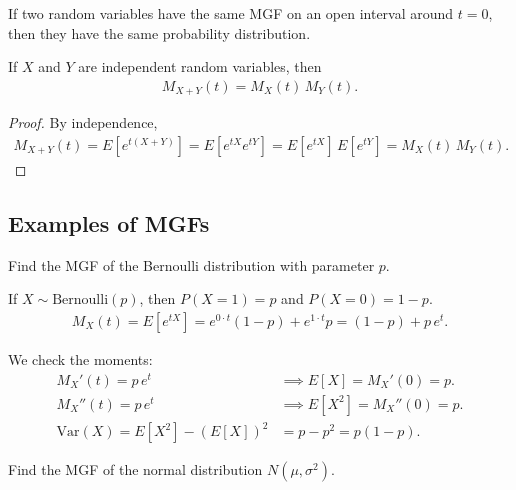 \begin{teorema}[Uniqueness]
If two random variables have the same MGF on an open interval around $t=0$, then they have the same probability distribution.
\end{teorema}

\begin{teorema}
If $X$ and $Y$ are independent random variables, then
\begin{align}
 \label{eq:2.8.13}
 M_{X+Y}(t) = M_X(t)\,M_Y(t).
\end{align}
\end{teorema}

\begin{proof}
By independence,
\begin{align}
 M_{X+Y}(t) = E[e^{t(X+Y)}] = E[e^{tX}e^{tY}] = E[e^{tX}]\,E[e^{tY}] = M_X(t)\,M_Y(t).
\end{align}
\end{proof}

\subsection{Examples of MGFs}

\begin{ejemplo}
 \label{exmp:2.8.4}
Find the MGF of the Bernoulli distribution with parameter $p$.
\end{ejemplo}

\begin{solucion}
If $X \sim \text{Bernoulli}(p)$, then $P(X=1) = p$ and $P(X=0) = 1-p$.
\begin{align}
 M_X(t) = E[e^{tX}] = e^{0 \cdot t}(1-p) + e^{1 \cdot t}p
 = (1-p) + p\,e^t.
\end{align}

We check the moments:
\begin{align}
 M_X'(t) = p\,e^t &\implies E[X] = M_X'(0) = p. \\
 M_X''(t) = p\,e^t &\implies E[X^2] = M_X''(0) = p. \\
 \text{Var}(X) = E[X^2] - (E[X])^2 &= p - p^2 = p(1-p).
\end{align}
\end{solucion}

\begin{ejemplo}
 \label{exmp:2.8.5}
Find the MGF of the normal distribution $N(\mu, \sigma^2)$.
\end{ejemplo}

